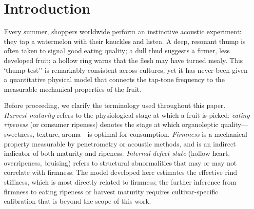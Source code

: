 \section{Introduction}
\label{sec:introduction}


Every summer, shoppers worldwide perform an instinctive acoustic
experiment: they tap a watermelon with their knuckles and listen.  A
deep, resonant thump is often taken to signal good eating quality; a
dull thud suggests a firmer, less developed fruit; a hollow ring warns
that the flesh may have turned mealy.  This `thump test'' is remarkably
consistent across cultures, yet it has never been given a quantitative
physical model that connects the tap-tone frequency to the measurable
mechanical properties of the fruit.


Before proceeding, we clarify the terminology used throughout this paper.
\emph{Harvest maturity} refers to the physiological stage at which a
fruit is picked; \emph{eating ripeness} (or consumer ripeness) denotes
the stage at which organoleptic quality---sweetness, texture,
aroma---is optimal for consumption.  \emph{Firmness} is a mechanical
property measurable by penetrometry or acoustic methods, and is an
indirect indicator of both maturity and ripeness.  \emph{Internal
defect state} (hollow heart, overripeness, bruising) refers to
structural abnormalities that may or may not correlate with firmness.
The model developed here estimates the effective rind stiffness, which
is most directly related to firmness; the further inference from
firmness to eating ripeness or harvest maturity requires
cultivar-specific calibration that is beyond the scope of this work.


